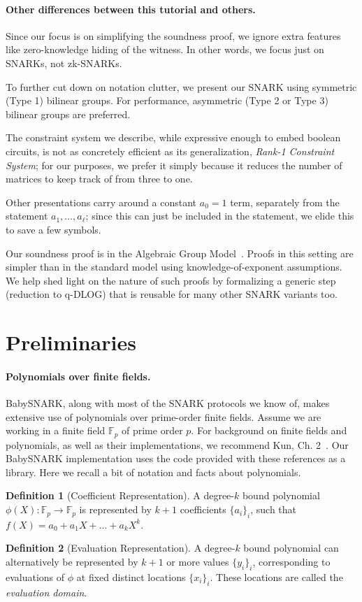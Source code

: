 \documentclass{article}
\theoremstyle{definition}
\newtheorem{definition}{Definition}[section]
\theoremstyle{remark}
\newcommand{\F}{\mathbb{F}}
\begin{document}
\paragraph{Other differences between this tutorial and others.} 
Since our focus is on simplifying the soundness proof, we ignore extra features like zero-knowledge hiding of the witness. In other words, we focus just on SNARKs, not zk-SNARKs.

To further cut down on notation clutter, we present our SNARK using symmetric (Type 1) bilinear groups. For performance, asymmetric (Type 2 or Type 3) bilinear groups are preferred.

The constraint system we describe, while expressive enough to embed boolean circuits, is not as concretely efficient as its generalization, \emph{Rank-1 Constraint System}; for our purposes, we prefer it simply because it reduces the number of matrices to keep track of from three to one.

Other presentations carry around a constant $a_0=1$ term, separately from the statement $a_1,\dots,a_\ell$; since this can just be included in the statement, we elide this to save a few symbols.

Our soundness proof is in the Algebraic Group Model~\cite{fuchsbauer2018algebraic}. Proofs in this setting are simpler than in the standard model using knowledge-of-exponent assumptions. We help shed light on the nature of such proofs by formalizing a generic step (reduction to q-DLOG) that is reusable for many other SNARK variants too.

\section{Preliminaries}

\paragraph{Polynomials over finite fields.}
BabySNARK, along with most of the SNARK protocols we know of, makes extensive use of polynomials over prime-order finite fields.
Assume we are working in a finite field $\F_p$ of prime order $p$.
For background on finite fields and polynomials, as well as their implementations, we recommend Kun, Ch. 2~\cite{pim,primer}. Our BabySNARK implementation uses the code provided with these references as a library.
Here we recall a bit of notation and facts about polynomials.


\theoremstyle{definition}
\begin{definition}[Coefficient Representation]
A degree-$k$ bound polynomial $\phi(X) : \F_p \rightarrow \F_p$ is represented by $k+1$ coefficients $\{a_i\}_i$, such that $f(X) = a_0 + a_1X + ... + a_k X^k$.
\end{definition}
\begin{definition}[Evaluation Representation]
A degree-$k$ bound polynomial can alternatively be represented by $k+1$ or more values $\{y_i\}_i$, corresponding to evaluations of $\phi$ at fixed distinct locations $\{x_i\}_i$. These locations are called the \emph{evaluation domain}.
\end{definition}
\end{document}
